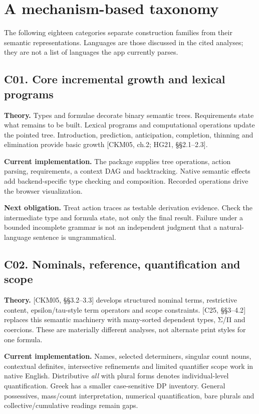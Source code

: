 \documentclass[11pt,a4paper]{article}
\begin{document}
\section{A mechanism-based taxonomy}\label{a-mechanism-based-taxonomy}

The following eighteen categories separate construction families from
their semantic representations. Languages are those discussed in the
cited analyses; they are not a list of languages the app currently
parses.

\subsection{C01. Core incremental growth and lexical
programs}\label{c01.-core-incremental-growth-and-lexical-programs}

\textbf{Theory.} Types and formulae decorate binary semantic trees.
Requirements state what remains to be built. Lexical programs and
computational operations update the pointed tree. Introduction,
prediction, anticipation, completion, thinning and elimination provide
basic growth {[}CKM05, ch.2; HG21, §§2.1--2.3{]}.

\textbf{Current implementation.} The package supplies tree operations,
action parsing, requirements, a context DAG and backtracking. Native
semantic effects add backend-specific type checking and composition.
Recorded operations drive the browser visualization.

\textbf{Next obligation.} Treat action traces as testable derivation
evidence. Check the intermediate type and formula state, not only the
final result. Failure under a bounded incomplete grammar is not an
independent judgment that a natural-language sentence is ungrammatical.

\subsection{C02. Nominals, reference, quantification and
scope}\label{c02.-nominals-reference-quantification-and-scope}

\textbf{Theory.} {[}CKM05, §§3.2--3.3{]} develops structured nominal
terms, restrictive content, epsilon/tau-style term operators and scope
constraints. {[}C25, §§3--4.2{]} replaces this semantic machinery with
many-sorted dependent types, Σ/Π and coercions. These are materially
different analyses, not alternate print styles for one formula.

\textbf{Current implementation.} Names, selected determiners, singular
count nouns, contextual definites, intersective refinements and limited
quantifier scope work in native English. Distributive \emph{all} with
plural forms denotes individual-level quantification. Greek has a
smaller case-sensitive DP inventory. General possessives, mass/count
interpretation, numerical quantification, bare plurals and
collective/cumulative readings remain gaps.
\end{document}
